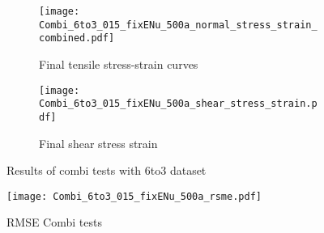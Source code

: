 \begin{figure}[H]
\centering
\begin{subfigure}[t]{0.495\textwidth}
    \centering
    \texttt{[image: Combi\_6to3\_015\_fixENu\_500a\_normal\_stress\_strain\_combined.pdf]}
    \caption{Final tensile stress-strain curves}
    \label{subfig:CombiTensileStressStrainCurve}
\end{subfigure}
\hfill
\begin{subfigure}[t]{0.495\textwidth}
    \centering
    \texttt{[image: Combi\_6to3\_015\_fixENu\_500a\_shear\_stress\_strain.pdf]}
    \caption{Final shear stress strain}
    \label{subfig:CombiShearStressStrain}
\end{subfigure}
\caption{Results of combi tests with 6to3 dataset}
\label{fig:CombiResults6to3}
\end{figure}

\begin{figure}[H]
    \centering
    \texttt{[image: Combi\_6to3\_015\_fixENu\_500a\_rsme.pdf]}
    \caption{RMSE Combi tests}
    \label{fig:combiRMSE}
\end{figure}


